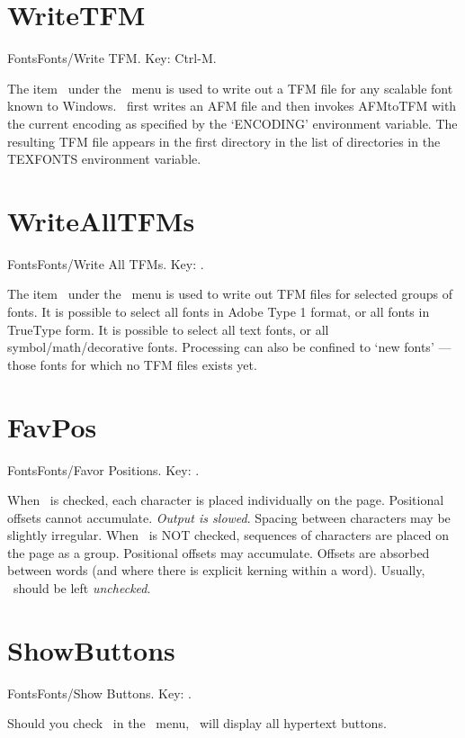 \section{WriteTFM}{Fonts}Fonts/Write TFM\ellipses. Key: Ctrl-M.

The item \ under the \ menu is used to write
out a TFM file for any scalable font known to Windows.  
\ first writes an AFM file and then invokes AFMtoTFM
with the current encoding as specified by the `ENCODING' environment
variable.
The resulting TFM file appears in the first directory in the
list of directories in the TEXFONTS environment variable.
   \bigskip

\section{WriteAllTFMs}{Fonts}Fonts/Write All TFMs\ellipses. Key: \none.

The item \ under the \ menu is used to write
out TFM files for selected groups of fonts.
It is possible to select all fonts in Adobe Type 1 format,
or all fonts in TrueType form. 
It is possible to select all text fonts, or all symbol/math/decorative
fonts. 
Processing can also be confined to `new fonts' --- those fonts for which
no TFM files exists yet.
   \bigskip

\newpage

\section{FavPos}{Fonts}Fonts/Favor Positions. Key: \none.

When \ is checked, each character is placed
individually on the page.  Positional offsets cannot accumulate.  {\it
Output is slowed}. Spacing between characters may be slightly irregular.
   \bigskip
When \ is NOT checked, sequences of characters are
placed on the page as a group.  Positional offsets may accumulate.  Offsets
are absorbed between words (and where there is explicit kerning within
a word).
   \bigskip
Usually, \ should be left {\it unchecked}.
   \bigskip

\section{ShowButtons}{Fonts}Fonts/Show Buttons. Key: \none.

Should you check \ in the \ menu,
\ will display all hypertext buttons.
   \bigskip

